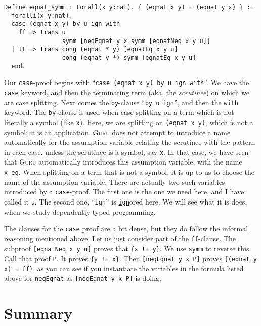 \documentclass{book}[12pt]
\newcommand{\guru}[0]{\textsc{Guru}\xspace}
\begin{document}
\begin{verbatim}
Define eqnat_symm : Forall(x y:nat). { (eqnat x y) = (eqnat y x) } :=
  foralli(x y:nat).
  case (eqnat x y) by u ign with
    ff => trans u
                symm [neqEqnat y x symm [eqnatNeq x y u]]
  | tt => trans cong (eqnat * y) [eqnatEq x y u]
                cong (eqnat y *) symm [eqnatEq x y u]
  end.                
\end{verbatim}

\noindent Our \texttt{case}-proof begins with ``\texttt{case (eqnat x
y) by u ign with}''.  We have the \texttt{case} keyword, and then the
terminating term (aka, the \emph{scrutinee}) on which we are case
splitting.  Next comes the \texttt{by}-clause ``\texttt{by u ign}'',
and then the \texttt{with} keyword.  The \texttt{by}-clause is used
when case splitting on a term which is not literally a symbol (like
\texttt{x}).  Here, we are splitting on \texttt{(eqnat x y)}, which is
not a symbol; it is an application.  \guru does not attempt to
introduce a name automatically for the assumption variable relating
the scrutinee with the pattern in each case, unless the scrutinee is a
symbol, say \texttt{x}.  In that case, we have seen that \guru
automatically introduces this assumption variable, with the name
\texttt{x\_eq}.  When splitting on a term that is not a symbol, it is
up to us to choose the name of the assumption variable.  There are
actually two such variables introduced by a \texttt{case}-proof.  The
first one is the one we need here, and I have called it \texttt{u}.
The second one, ``\texttt{ign}'' is \underline{\texttt{ign}}ored here.
We will see what it is does, when we study dependently typed
programming.

The clauses for the \texttt{case} proof are a bit dense, but they do
follow the informal reasoning mentioned above.  Let us just consider
part of the \texttt{ff}-clause.  The subproof \texttt{[eqnatNeq x y
u]} proves that \texttt{\{x != y\}}.  We use \texttt{symm} to reverse
this.  Call that proof \texttt{P}.  It proves \texttt{\{y != x\}}.
Then \texttt{[neqEqnat y x P]} proves \texttt{\{(eqnat y x) = ff\}},
as you can see if you instantiate the variables in the formula listed
above for \texttt{neqEqnat} as \texttt{[neqEqnat y x P]} is doing.


\section{Summary}
\end{document}
